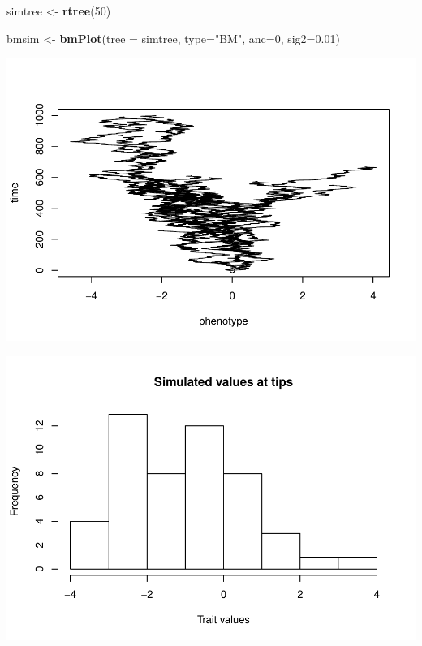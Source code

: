 \documentclass[]{article}
\newenvironment{Shaded}{\begin{snugshade}}{\end{snugshade}}
\newcommand{\KeywordTok}[1]{\textcolor[rgb]{0.13,0.29,0.53}{\textbf{#1}}}
\newcommand{\DataTypeTok}[1]{\textcolor[rgb]{0.13,0.29,0.53}{#1}}
\newcommand{\DecValTok}[1]{\textcolor[rgb]{0.00,0.00,0.81}{#1}}
\newcommand{\FloatTok}[1]{\textcolor[rgb]{0.00,0.00,0.81}{#1}}
\newcommand{\StringTok}[1]{\textcolor[rgb]{0.31,0.60,0.02}{#1}}
\newcommand{\CommentTok}[1]{\textcolor[rgb]{0.56,0.35,0.01}{\textit{#1}}}
\newcommand{\OperatorTok}[1]{\textcolor[rgb]{0.81,0.36,0.00}{\textbf{#1}}}
\newcommand{\NormalTok}[1]{#1}
\begin{document}
\begin{Shaded}
\begin{Highlighting}[]
\NormalTok{simtree <-}\StringTok{ }\KeywordTok{rtree}\NormalTok{(}\DecValTok{50}\NormalTok{)}

\NormalTok{bmsim <-}\StringTok{ }\KeywordTok{bmPlot}\NormalTok{(}\DataTypeTok{tree =}\NormalTok{ simtree, }
       \DataTypeTok{type=}\StringTok{"BM"}\NormalTok{, }
       \DataTypeTok{anc=}\DecValTok{0}\NormalTok{, }
       \DataTypeTok{sig2=}\FloatTok{0.01}\NormalTok{)}
\end{Highlighting}
\end{Shaded}

\includegraphics{module_08_files/figure-latex/unnamed-chunk-17-1.pdf}

\begin{Shaded}
\end{Shaded}

\includegraphics{module_08_files/figure-latex/unnamed-chunk-17-2.pdf}
\end{document}
